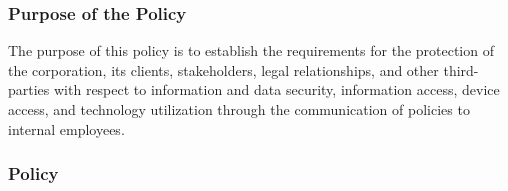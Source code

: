 \documentclass[stu]{apa7}
\begin{document}
\subsubsection{Purpose of the Policy}
\label{sec:org453f311}

The purpose of this policy is to establish the requirements for the protection of the corporation, its clients, stakeholders, legal relationships, and other third-parties with respect to information and data security, information access, device access, and technology utilization through the communication of policies to internal employees.


\subsubsection{Policy}
\label{sec:org2f2da03}
\end{document}
